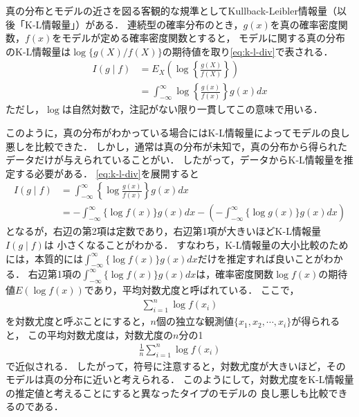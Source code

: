 真の分布とモデルの近さを図る客観的な規準としてKullback-Leibler情報量（以後「K-L情報量」）がある．
連続型の確率分布のとき，$g(x)$を真の確率密度関数，$f(x)$をモデルが定める確率密度関数とすると，
モデルに関する真の分布のK-L情報量は$\log\{g(X)/f(X)\}$の期待値を取り\eqref{eq:k-l-div}で表される．
\begin{align}
  \label{eq:k-l-div}
  I(g \mid f) &= E_X\left(\log \left\{\frac{g(X)}{f(X)}\right\}\right)\\\nonumber
              &= \int^{\infty}_{-\infty}\log\left\{\frac{g(x)}{f(x)}\right\}g(x)dx
\end{align}
ただし，$\log$は自然対数で，注記がない限り一貫してこの意味で用いる．

このように，真の分布がわかっている場合にはK-L情報量によってモデルの良し悪しを比較できた．
しかし，通常は真の分布が未知で，真の分布から得られたデータだけが与えられていることがい．
したがって，データからK-L情報量を推定する必要がある．
\eqref{eq:k-l-div}を展開すると
\begin{align*}
  I(g \mid f) &= \int^{\infty}_{-\infty}\left\{\log\frac{g(x)}{f(x)}\right\}g(x)dx\\\nonumber
              &= -\int^{\infty}_{-\infty}\{\log f(x)\}g(x)dx - 
                 \left(-\int^{\infty}_{-\infty}\{\log g(x)\}g(x)dx\right)
\end{align*}
となるが，右辺の第2項は定数であり，右辺第1項が大きいほどK-L情報量$I(g \mid f)$は
小さくなることがわかる．
すなわち，K-L情報量の大小比較のためには，本質的には$\int^{\infty}_{-\infty}\{\log f(x)\}g(x)dx$だけを推定すれば良いことがわかる．
右辺第1項の$\int^{\infty}_{-\infty}\{\log f(x)\}g(x)dx$は，確率密度関数$\log f(x)$の期待値$E( \log f(x))$であり，平均対数尤度と呼ばれている．
ここで，
\begin{align*}
  \sum_{i=1}^{n}\log f(x_i)
\end{align*}
を対数尤度と呼ぶことにすると，$n$個の独立な観測値$\{x_1, x_2, \cdots, x_i\}$が得られると，
この平均対数尤度は，対数尤度の$n$分の1
\begin{align*}
  \frac{1}{n}\sum_{i=1}^{n}\log f(x_i)
\end{align*}
で近似される．
したがって，符号に注意すると，対数尤度が大きいほど，そのモデルは真の分布に近いと考えられる．
このようにして，対数尤度をK-L情報量の推定値と考えることにすると異なったタイプのモデルの
良し悪しも比較できるのである．

